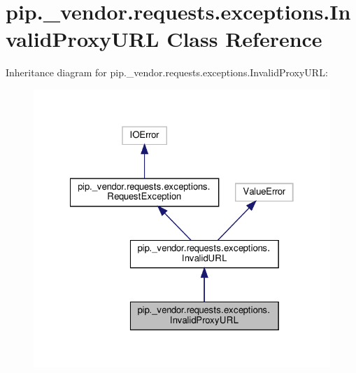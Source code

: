 \hypertarget{classpip_1_1__vendor_1_1requests_1_1exceptions_1_1InvalidProxyURL}{}\section{pip.\+\_\+vendor.\+requests.\+exceptions.\+Invalid\+Proxy\+U\+RL Class Reference}
\label{classpip_1_1__vendor_1_1requests_1_1exceptions_1_1InvalidProxyURL}


Inheritance diagram for pip.\+\_\+vendor.\+requests.\+exceptions.\+Invalid\+Proxy\+U\+RL\+:
\nopagebreak
\begin{figure}[H]
\begin{center}
\leavevmode
\includegraphics[width=322pt]{classpip_1_1__vendor_1_1requests_1_1exceptions_1_1InvalidProxyURL__inherit__graph}
\end{center}
\end{figure}


